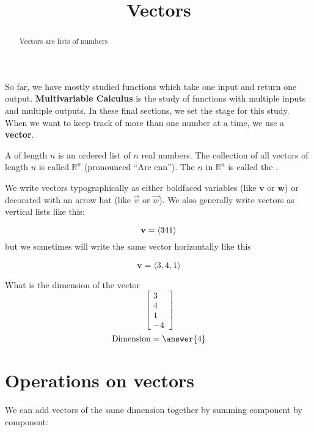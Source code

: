 \documentclass{ximera}
\title[Dig-In:]{Vectors}
\begin{document}
\begin{abstract}
  Vectors are lists of numbers
\end{abstract}
\maketitle

So far, we have mostly studied functions which take one input and
return one output.  \textbf{Multivariable Calculus} is the study of
functions with multiple inputs and multiple outputs.  In these final
sections, we set the stage for this study.  When we want to keep track
of more than one number at a time, we use a \textbf{vector}.

\begin{definition}
  A  of length $n$ is an ordered list of $n$ real numbers.
  The collection of all vectors of length $n$ is called $\mathbb{R}^n$
  (pronounced ``Are enn'').  The $n$ in $\mathbb{R}^n$ is called the
  .
\end{definition}

We write vectors typographically as either boldfaced variables (like
$\mathbf{v}$ or $\mathbf{w}$) or decorated with an arrow hat (like
$\vec{v}$ or $\vec{w}$).  We also generally write vectors as vertical
lists like this:

\[
\mathbf{v} = \vecList{3;4;1}
\]
but we sometimes will write the same vector horizontally like this

\[
\mathbf{v} = \langle 3, 4, 1 \rangle
\]

\begin{question}
  What is the dimension of the vector 
  \[
  \begin{bmatrix} 3 \\ 4 \\1 \\ -4 \end{bmatrix}
  \]
  \[
  \textrm{Dimension} = \answer{4}
  \]
\end{question}

\section{Operations on vectors}

We can add vectors of the same dimension together by summing component by component:
\end{document}
